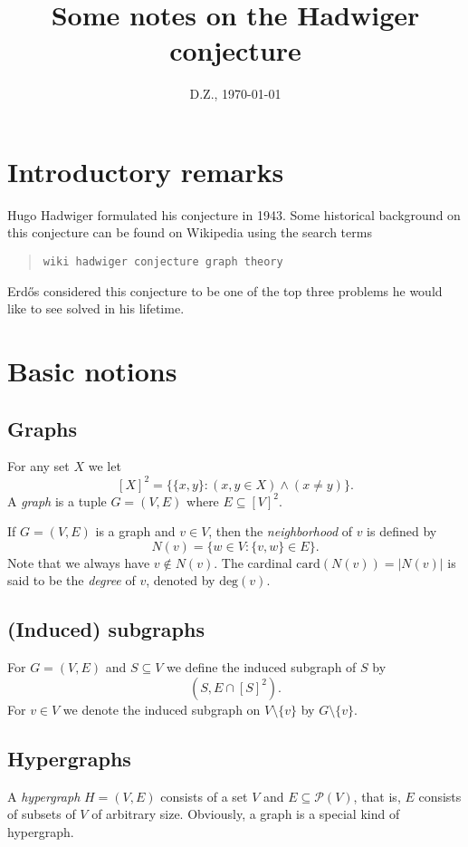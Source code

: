 \documentclass[12pt, a4paper]{amsart}
\begin{document}
\title{Some notes on the Hadwiger conjecture}
\author{D.Z., \today}
\maketitle
\section{Introductory remarks}
Hugo Hadwiger formulated his conjecture in 1943. 
Some historical background on this conjecture can be
found on Wikipedia using the search terms 
\begin{quote}{\tt wiki hadwiger conjecture graph theory}
\end{quote}
Erd\H{o}s considered this conjecture to be one of the 
top three problems he would like to see solved in his 
lifetime.
\section{Basic notions}
\subsection{Graphs} For any set $X$ we let $$[X]^2 = \big\{\{x,y\}: (x, y\in X)
\land (x\neq y)\big\}.$$ A {\em graph} is a tuple $G =(V,E)$
where $E \subseteq [V]^2$. 

If $G=(V,E)$ is a graph and $v\in V$, then the {\em neighborhood}
of $v$ is defined by $$N(v) = \{w\in V:\{v,w\}\in E\}.$$ Note
that we always have $v\notin N(v)$. The cardinal 
$\text{card}(N(v)) = |N(v)|$ is said to be the {\em degree} of $v$,
denoted by $\text{deg}(v)$.

\subsection{(Induced) subgraphs} For $G=(V,E)$ and $S\subseteq V$
we define the induced subgraph of $S$ by $$(S, E\cap [S]^2).$$
For $v\in V$ we denote the induced subgraph on $V\setminus\{v\}$ by
$G\setminus\{v\}$.


\subsection{Hypergraphs} A {\em hypergraph} $H=(V,E)$ consists of a
set $V$ and $E\subseteq {\mathcal P}(V)$, that is, $E$ 
consists of subsets of $V$ of arbitrary size. Obviously,
a graph is a special kind of hypergraph.
\end{document}
